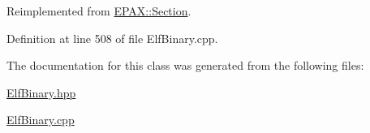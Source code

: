 \-Reimplemented from \hyperlink{class_e_p_a_x_1_1_section_ad79a91be22efd4499b78d2554ebc8285}{\-E\-P\-A\-X\-::\-Section}.



\-Definition at line 508 of file \-Elf\-Binary.\-cpp.



\-The documentation for this class was generated from the following files\-:\begin{DoxyCompactItemize}
\item 
\hyperlink{_elf_binary_8hpp}{\-Elf\-Binary.\-hpp}\item 
\hyperlink{_elf_binary_8cpp}{\-Elf\-Binary.\-cpp}\end{DoxyCompactItemize}
